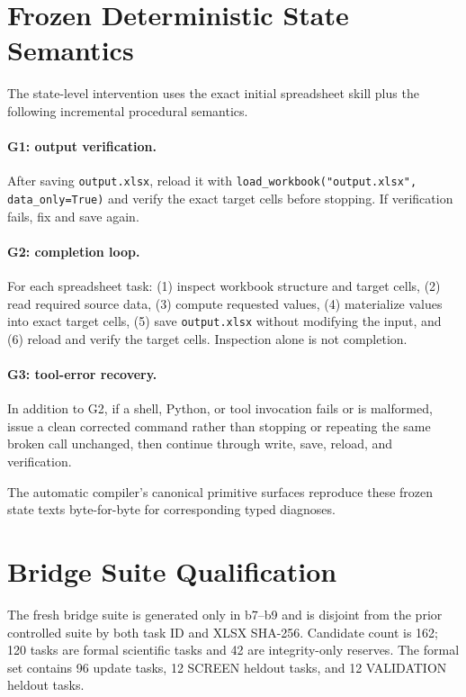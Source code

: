 \section{Frozen Deterministic State Semantics}

The state-level intervention uses the exact initial spreadsheet skill plus the following incremental procedural semantics.

\paragraph{G1: output verification.}
After saving \texttt{output.xlsx}, reload it with \texttt{load\_workbook("output.xlsx", data\_only=True)} and verify the exact target cells before stopping. If verification fails, fix and save again.

\paragraph{G2: completion loop.}
For each spreadsheet task: (1) inspect workbook structure and target cells, (2) read required source data, (3) compute requested values, (4) materialize values into exact target cells, (5) save \texttt{output.xlsx} without modifying the input, and (6) reload and verify the target cells. Inspection alone is not completion.

\paragraph{G3: tool-error recovery.}
In addition to G2, if a shell, Python, or tool invocation fails or is malformed, issue a clean corrected command rather than stopping or repeating the same broken call unchanged, then continue through write, save, reload, and verification.

The automatic compiler's canonical primitive surfaces reproduce these frozen state texts byte-for-byte for corresponding typed diagnoses.

\section{Bridge Suite Qualification}

The fresh bridge suite is generated only in b7--b9 and is disjoint from the prior controlled suite by both task ID and XLSX SHA-256. Candidate count is 162; 120 tasks are formal scientific tasks and 42 are integrity-only reserves. The formal set contains 96 update tasks, 12 SCREEN heldout tasks, and 12 VALIDATION heldout tasks.


